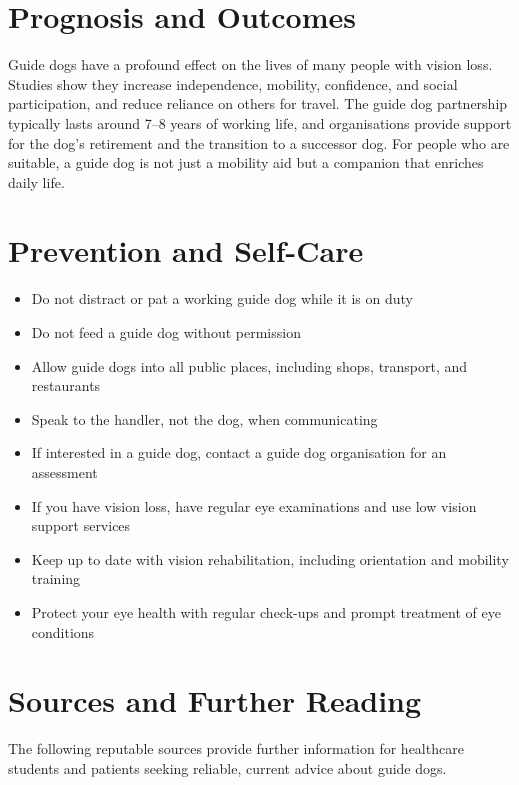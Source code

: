 \section*{Prognosis and Outcomes}
Guide dogs have a profound effect on the lives of many people with vision loss. Studies show they increase independence, mobility, confidence, and social participation, and reduce reliance on others for travel. The guide dog partnership typically lasts around 7--8 years of working life, and organisations provide support for the dog's retirement and the transition to a successor dog. For people who are suitable, a guide dog is not just a mobility aid but a companion that enriches daily life.

\section*{Prevention and Self-Care}
\begin{itemize}
    \item Do not distract or pat a working guide dog while it is on duty
    \item Do not feed a guide dog without permission
    \item Allow guide dogs into all public places, including shops, transport, and restaurants
    \item Speak to the handler, not the dog, when communicating
    \item If interested in a guide dog, contact a guide dog organisation for an assessment
    \item If you have vision loss, have regular eye examinations and use low vision support services
    \item Keep up to date with vision rehabilitation, including orientation and mobility training
    \item Protect your eye health with regular check-ups and prompt treatment of eye conditions
\end{itemize}

\section*{Sources and Further Reading}
The following reputable sources provide further information for healthcare students and patients seeking reliable, current advice about guide dogs.

